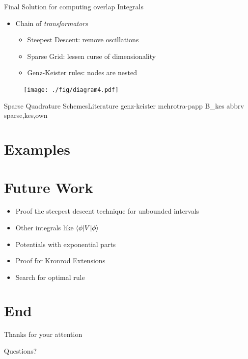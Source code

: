 \documentclass{beamer}
\begin{document}
\begin{frame}{Final Solution for computing overlap Integrals}
  \begin{itemize}
    \item Chain of \emph{transformators}
    \begin{itemize}
      \item Steepest Descent: remove oscillations
      \item Sparse Grid: lessen curse of dimensionality
      \item Genz-Keister rules: nodes are nested
    \end{itemize}
  \end{itemize}
  \begin{figure}
    \centering
    \texttt{[image: ./fig/diagram4.pdf]}
  \end{figure}
\end{frame}


\begin{frame}{Sparse Quadrature Schemes}{Literature}
  \nocite{sqs}{genz-keister}
  \nocite{sqs}{mehrotra-papp}
  \nocite{sqs}{B_kes}
  \scriptsize
  {abbrv}
  {sparse,kes,own}{}
\end{frame}


\section{Examples}



\section{Future Work}

\begin{frame}
  \begin{itemize}
    \item Proof the steepest descent technique for unbounded intervals
    \item Other integrals like $\braket{\phi|V|\phi}$
    \item Potentials with exponential parts
    \item Proof for Kronrod Extensions
    \item Search for optimal rule
  \end{itemize}
\end{frame}


\section{End}

\begin{frame}{Thanks for your attention}
  \begin{center}
    {\Huge{Questions?}}
  \end{center}
\end{frame}
\end{document}
